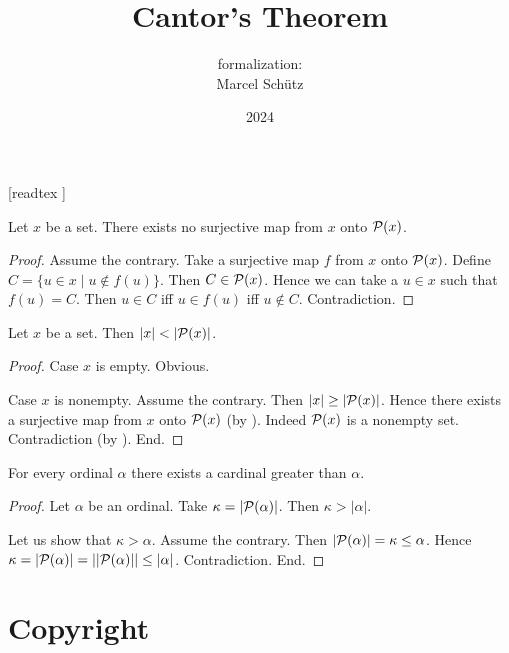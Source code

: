\documentclass{article}
\title{Cantor's Theorem}
\author{\Naproche formalization: \vspace{0.5em} \\
Marcel Schütz}
\date{2024}
\begin{document}
  \maketitle

  \begin{imports}
    \begin{forthel}
      [readtex ]
    \end{forthel}
  \end{imports}

  \begin{forthel}
    \begin{theorem*}\label{cantor}
      Let $x$ be a set.
      There exists no surjective map from $x$ onto $\mathcal{P}(x)$.
    \end{theorem*}
    \begin{proof}
      Assume the contrary.
      Take a surjective map $f$ from $x$ onto $\mathcal{P}(x)$.
      Define $C = \{ u \in x \mid u \notin f(u) \}$.
      Then $C \in \mathcal{P}(x)$.
      Hence we can take a $u \in x$ such that $f(u) = C$.
      Then $u \in C$ iff $u \in f(u)$ iff $u \notin C$.
      Contradiction.
    \end{proof}
  \end{forthel}

  \begin{forthel}
    \begin{corollary*}
      Let $x$ be a set.
      Then $|x| < |\mathcal{P}(x)|$.
    \end{corollary*}
    \begin{proof}
      Case $x$ is empty. Obvious.

      Case $x$ is nonempty.
        Assume the contrary.
        Then $|x| \geq |\mathcal{P}(x)|$.
        Hence there exists a surjective map from $x$ onto $\mathcal{P}(x)$ (by ).
        Indeed $\mathcal{P}(x)$ is a nonempty set.
        Contradiction (by ).
      End.
    \end{proof}
  \end{forthel}

  \begin{forthel}
    \begin{corollary*}
      For every ordinal $\alpha$ there exists a cardinal greater than $\alpha$.
    \end{corollary*}
    \begin{proof}
      Let $\alpha$ be an ordinal.
      Take $\kappa = |\mathcal{P}(\alpha)|$.
      Then $\kappa > |\alpha|$.

      Let us show that $\kappa > \alpha$.
        Assume the contrary.
        Then $|\mathcal{P}(\alpha)|
          = \kappa
          \leq \alpha$.
        Hence $\kappa
          = |\mathcal{P}(\alpha)|
          = ||\mathcal{P}(\alpha)||
          \leq |\alpha|$.
        Contradiction.
      End.
    \end{proof}
  \end{forthel}

  \section*{Copyright}
  \doclicenseThis
\end{document}
